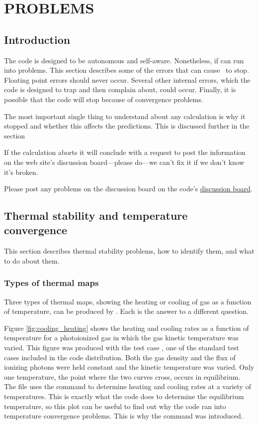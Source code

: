 \chapter{PROBLEMS}

\section{Introduction}

The code is designed to be autonomous and self-aware.
Nonetheless, if can run into problems.
This section describes some of the errors that can cause
\Cloudy\ to stop.
Floating point errors should never occur.
Several other internal errors, which the code is designed to trap
and then complain about, could occur.
Finally, it is possible that the code will stop because of
convergence problems.

The most important single thing to understand about any calculation is
why it stopped and whether this affects the predictions.
This is discussed
further in the section 

If the calculation aborts it will conclude with a request to post the
information on the web site's discussion board---please do---we can't fix
it if we don't know it's broken.

Please post any problems on the discussion board on the code's
\href{http://tech.groups.yahoo.com/group/cloudy_simulations}{discussion board}.

\section{Thermal stability and temperature convergence}
\label{sec:ThermalStabilityProblems}

This section describes thermal stability problems, how to identify them,
and what to do about them.

\subsection{Types of thermal maps}

Three types of thermal maps, showing the heating or cooling of gas as
a function of temperature, can be produced by \Cloudy.  Each is the answer
to a different question.

Figure \ref{fig:cooling_heating} shows the heating and cooling
rates as a function of temperature
for a photoionized gas in which the gas kinetic temperature was varied.
This figure was produced with the test case ,
one of the standard
test cases included in the code distribution.
Both the gas density and
the flux of ionizing photons were held constant and the kinetic temperature
was varied.
Only one temperature, the point where the two curves cross,
occurs in equilibrium.
The  file uses the
 command
to determine heating and cooling rates at a variety of temperatures.
This
is exactly what the code does to determine the equilibrium temperature,
so this plot can be useful to find out why the code ran into temperature
convergence problems.
This is why the command was introduced.

